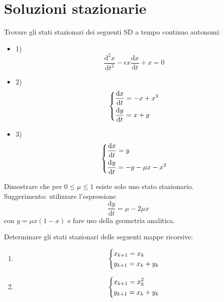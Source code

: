 \section{Soluzioni stazionarie}%
\begin{ex}
    Trovare gli stati stazionari dei seguenti SD a tempo continuo autonomi:
    \begin{itemize}
    \item 1) \[
            \frac{\text{d} ^2x}{\text{d} t^2} - \epsilon x\frac{\text{d} x}{\text{d} t}  + x = 0
        \] 
    \item  2)
	\[\begin{dcases}
        \frac{\text{d} x}{\text{d} t} = - x + x^3\\
	\frac{\text{d} y}{\text{d} t} = x + y
        \end{dcases}\] 
    \item 3)
        \[\begin{dcases}
        \frac{\text{d} x}{\text{d} t} = y \\
	\frac{\text{d} y}{\text{d} t} =- y - \mu x - x^2
        \end{dcases}\] 
    \end{itemize}
\end{ex}
\noindent
\begin{ex}
    Dimostrare che per $0\le \mu\le 1$ esiste solo uno stato stazionario.\\
     Suggerimento: utilizzare l'espressione 
    \[
        \frac{\text{d} y}{\text{d} t} = \mu-2\mu x
    \] con $y = \mu x(1-x)$ e fare uso della geometria analitica.
\end{ex}
\noindent
\begin{ex}
    Determinare gli stati stazionari delle seguenti mappe ricorsive:
    \begin{enumerate}
        \item 
	    \[\begin{dcases}
	        x_{k+1}=x_k\\
		y_{k+1}=x_k + y_k
	    \end{dcases}\] 
	\item
	    \[\begin{dcases}
	        x_{k+1}=x_k^2\\
		y_{k+1}=x_k + y_k
	    \end{dcases}\] 
    \end{enumerate}
\end{ex}
\noindent
